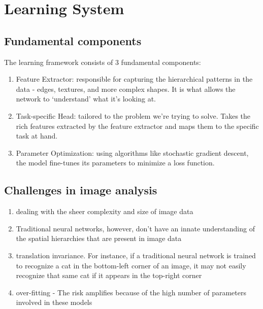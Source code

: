 \documentclass[11pt]{article}
\begin{document}


\tableofcontents

\clearpage

\section{Learning System}

\subsection{Fundamental components}

The learning framework consists of 3 fundamental components:

\begin{enumerate}
    \item Feature Extractor: responsible for capturing the hierarchical patterns in the data - edges, textures, and more complex shapes. It is what allows the network to `understand' what it's looking at.
    \item Task-specific Head: tailored to the problem we're trying to solve. Takes the rich features extracted by the feature extractor and maps them to the specific task at hand.
    \item Parameter Optimization: using algorithms like stochastic gradient descent, the model fine-tunes its parameters to minimize a loss function.
\end{enumerate}

\subsection{Challenges in image analysis}

\begin{enumerate}
    \item dealing with the sheer complexity and size of image data
    \item Traditional neural networks, however, don't have an innate understanding of the spatial hierarchies that are present in image data
    \item translation invariance. For instance, if a traditional neural network is trained to recognize a cat in the bottom-left corner of an image, it may not easily recognize that same cat if it appears in the top-right corner
    \item over-fitting - The risk amplifies because of the high number of parameters involved in these models
\end{enumerate}
\end{document}
